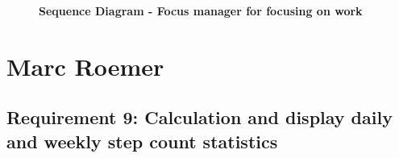 \documentclass{article}
\begin{document}
		\begin{figure}[htbp]
			\centering
			\textbf{Sequence Diagram - Focus manager for focusing on work}
			\begin{subfigure}{\textwidth}
				\centering
				
			\end{subfigure}
			\begin{subfigure}{\textwidth}
			
			\end{subfigure}
		\end{figure} 
		\clearpage

	

\section{Marc Roemer}
	\subsection{Requirement 9: Calculation and display daily and weekly step count statistics}
			
\end{document}
